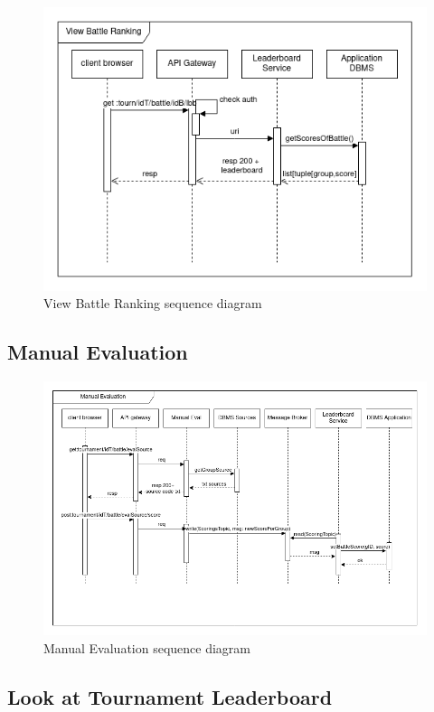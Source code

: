 \begin{figure}[H]
    \centering
    \includegraphics[width=1\linewidth]{misc//Images//UC/UC9.png}
    \caption{View Battle Ranking sequence diagram}
    \label{fig:enter-label}
\end{figure}
\newpage
\subsection{Manual Evaluation}

\begin{figure}[H]
    \centering
    \includegraphics[width=1\linewidth]{misc//Images//UC/UC10.png}
    \caption{Manual Evaluation sequence diagram}
    \label{fig:enter-label}
\end{figure}
\newpage
\subsection{Look at Tournament Leaderboard}

